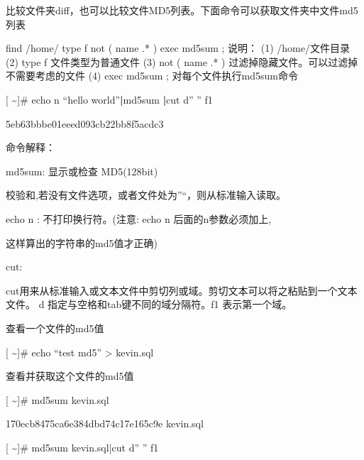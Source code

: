 \documentclass[letterpaper,12pt,english]{sphinxmanual}
\begin{document}
比较文件夹diff，也可以比较文件MD5列表。下面命令可以获取文件夹中文件md5列表

\begin{sphinxVerbatim}[commandchars=\\\{\}]
find /home/ \PYGZhy{}type f \PYGZhy{}not \PYGZbs{}( \PYGZhy{}name \PYGZsq{}.*\PYGZsq{} \PYGZbs{}) \PYGZhy{}exec md5sum \PYGZob{}\PYGZcb{} \PYGZbs{};
说明：
(1) /home/文件目录
(2) \PYGZhy{}type f 文件类型为普通文件
(3) \PYGZhy{}not \PYGZbs{}( \PYGZhy{}name \PYGZsq{}.*\PYGZsq{} \PYGZbs{})  过滤掉隐藏文件。可以过滤掉不需要考虑的文件
(4) \PYGZhy{}exec md5sum \PYGZob{}\PYGZcb{} \PYGZbs{};  对每个文件执行md5sum命令
\end{sphinxVerbatim}


{[} \textasciitilde{}{]}\# echo \sphinxhyphen{}n “hello world”{\color{red}\bfseries{}|}md5sum {\color{red}\bfseries{}|}cut \sphinxhyphen{}d” ” \sphinxhyphen{}f1

5eb63bbbe01eeed093cb22bb8f5acdc3

命令解释：

md5sum: 显示或检查 MD5(128\sphinxhyphen{}bit)

校验和,若没有文件选项，或者文件处为”\sphinxhyphen{}“，则从标准输入读取。

echo \sphinxhyphen{}n : 不打印换行符。(注意: echo \sphinxhyphen{}n 后面的\sphinxhyphen{}n参数必须加上,

这样算出的字符串的md5值才正确)

cut:

cut用来从标准输入或文本文件中剪切列或域。剪切文本可以将之粘贴到一个文本文件。 \sphinxhyphen{}d 指定与空格和tab键不同的域分隔符。\sphinxhyphen{}f1 表示第一个域。

查看一个文件的md5值

{[} \textasciitilde{}{]}\# echo “test md5” > kevin.sql

查看并获取这个文件的md5值

{[} \textasciitilde{}{]}\# md5sum kevin.sql

170ecb8475ca6e384dbd74c17e165c9e  kevin.sql

{[} \textasciitilde{}{]}\# md5sum kevin.sql|cut \sphinxhyphen{}d” ” \sphinxhyphen{}f1
\end{document}
